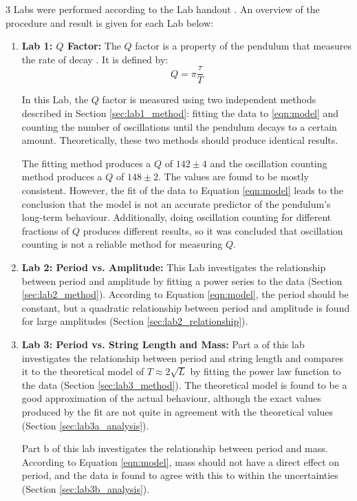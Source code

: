 \documentclass[aps,twocolumn,secnumarabic,nobalancelastpage,amsmath,amssymb,nofootinbib,floatfix,letterpaper]{revtex4}
\begin{document}
3 Labs were performed according to the Lab handout \cite{lab}. An overview of the procedure and result is given for each
Lab below:
\begin{enumerate}
    \item
    \textbf{Lab 1: \(Q\) Factor:}
    The \(Q\) factor is a property of the pendulum that measures the rate of decay \cite{lab}. It is defined by:
    \begin{equation}
        Q = \pi\frac{\tau}{T}
        \label{eqn:qfactor}
    \end{equation}

    In this Lab, the \(Q\) factor is measured using two independent methods described in Section \ref{sec:lab1_method}:
    fitting the data to \ref{eqn:model} and counting the number of oscillations until the pendulum decays to a certain
    amount. Theoretically, these two methods should produce identical results.

    The fitting method produces a \(Q\) of \(142 \pm 4\) and the oscillation counting method produces a \(Q\) of
    \(148 \pm 2\). The values are found to be mostly consistent. However, the fit of the data to Equation \ref{eqn:model}
    leads to the conclusion that the model is not an accurate predictor of the pendulum's long-term behaviour.
    Additionally, doing oscillation counting for different fractions of \(Q\) produces different results, so it was
    concluded that oscillation counting is not a reliable method for measuring \(Q\).

    \item
    \textbf{Lab 2: Period vs. Amplitude:}
    This Lab investigates the relationship between period and amplitude by fitting a power series to the data (Section
    \ref{sec:lab2_method}).
    According to Equation \ref{eqn:model}, the period should be constant, but a quadratic relationship between period and
    amplitude is found for large amplitudes (Section \ref{sec:lab2_relationship}).

    \item
    \textbf{Lab 3: Period vs. String Length and Mass:}
    Part a of this lab investigates the relationship between period and string length and compares it to the theoretical
    model of \(T \approx 2\sqrt{L}\) \cite{lab} by fitting the power law function to the data (Section \ref{sec:lab3_method}).
    The theoretical model is found to be a good approximation of the actual behaviour, although the exact values
    produced by the fit are not quite in agreement with the theoretical values (Section \ref{sec:lab3a_analysis}).

    Part b of this lab investigates the relationship between period and mass. According to Equation \ref{eqn:model},
    mass should not have a direct effect on period, and the data is found to agree with this to within the uncertainties
    (Section \ref{sec:lab3b_analysis}).
\end{enumerate}
\end{document}
